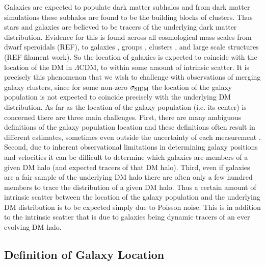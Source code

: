 Galaxies are expected to populate dark matter subhalos \citep[e.g.][]{Yang:2012gg} and from dark matter simulations these subhalos are found to be the building blocks of clusters.
Thus stars and galaxies are believed to be tracers of the underlying dark matter distribution.
Evidence for this is found across all cosmological mass scales from dwarf speroidals (REF), to galaxies \citep[e.g.][]{Choi:2011wv, Choi:2012uo}, groups \citep[e.g.][]{George:2012uo}, clusters \citep[e.g.][]{Dahle:2000uz}, and large scale structures (REF filament work).
So the location of galaxies is expected to coincide with the location of the DM in $\Lambda$CDM, to within some amount of intrinsic scatter.
It is precisely this phenomenon that we wish to challenge with observations of merging galaxy clusters, since for some non-zero $\sigma_{\rm SIDM}$ the location of the galaxy population is not expected to coincide precisely with the underlying DM distribution.
As far as the location of the galaxy population (i.e. its center) is concerned there are three main challenges.
First, there are many ambiguous definitions of the galaxy population location and these definitions often result in different estimates, sometimes even outside the uncertainty of each measurement \citep{George:2012uo}.
Second, due to inherent observational limitations in determining galaxy positions and velocities it can be difficult to determine which galaxies are members of a given DM halo (and expected tracers of that DM halo).
Third, even if galaxies are a fair sample of the underlying DM halo there are often only a few hundred members to trace the distribution of a given DM halo.
Thus a certain amount of intrinsic scatter between the location of the galaxy population and the underlying DM distribution is to be expected simply due to Poisson noise.
This is in addition to the intrinsic scatter that is due to galaxies being dynamic tracers of an ever evolving DM halo. 

\subsection{Definition of Galaxy Location}

